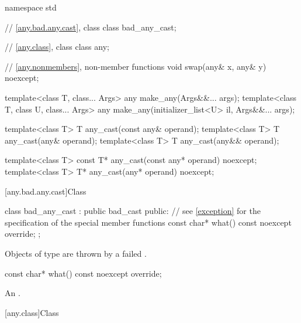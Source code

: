 \begin{codeblock}
namespace std {
  // \ref{any.bad.any.cast}, class 
  class bad_any_cast;

  // \ref{any.class}, class 
  class any;

  // \ref{any.nonmembers}, non-member functions
  void swap(any& x, any& y) noexcept;

  template<class T, class... Args>
    any make_any(Args&&... args);
  template<class T, class U, class... Args>
    any make_any(initializer_list<U> il, Args&&... args);

  template<class T>
    T any_cast(const any& operand);
  template<class T>
    T any_cast(any& operand);
  template<class T>
    T any_cast(any&& operand);

  template<class T>
    const T* any_cast(const any* operand) noexcept;
  template<class T>
    T* any_cast(any* operand) noexcept;
}
\end{codeblock}

[any.bad.any.cast]{Class }

%
\begin{codeblock}
class bad_any_cast : public bad_cast {
public:
  // see \ref{exception} for the specification of the special member functions
  const char* what() const noexcept override;
};
\end{codeblock}

\pnum
Objects of type  are thrown by a failed
.

%
\begin{itemdecl}
const char* what() const noexcept override;
\end{itemdecl}

\begin{itemdescr}
\pnum
\returns
An  \ntbs{}.
\end{itemdescr}

[any.class]{Class }


